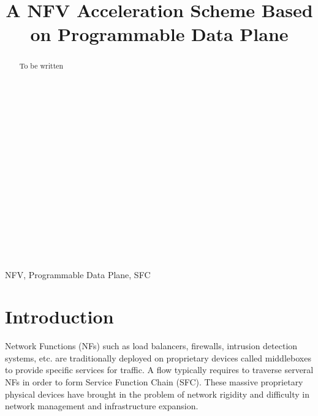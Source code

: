\documentclass[10pt, conference, letterpaper]{IEEEtran}
\begin{document}
\title{A NFV Acceleration Scheme Based on Programmable Data Plane\\
}


\maketitle


\begin{abstract}
To be written
~\\\\\\\\\\\\\\\\\\\\\\\\\\\\\\\\\
\end{abstract}

\begin{IEEEkeywords}
NFV, Programmable Data Plane, SFC
\end{IEEEkeywords}

\section{Introduction}
Network Functions (NFs) such as load balancers, firewalls, intrusion detection systems, etc. are traditionally deployed on proprietary devices called middleboxes to provide specific services for traffic. A flow typically requires to traverse serveral NFs in order to form Service Function Chain (SFC).  These massive proprietary physical devices have brought in the problem of network rigidity and difficulty in network management and infrastructure expansion.
\end{document}
